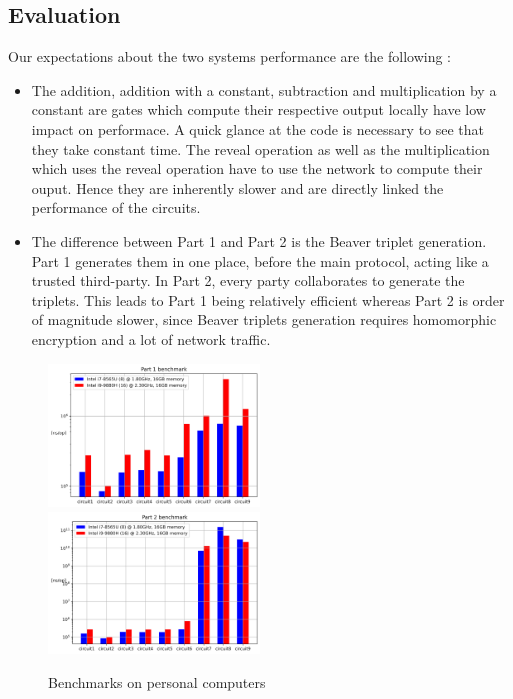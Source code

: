 \documentclass[10pt,conference]{IEEEtran}
\begin{document}
\begin{itemize}
\section{Evaluation}
Our expectations about the two systems performance are the following :
\begin{itemize}
    \item The addition, addition with a constant, subtraction and multiplication by a constant are gates which compute their respective output locally have low impact on performace. A quick glance at the code is necessary to see that they take constant time. The reveal operation as well as the multiplication which uses the reveal operation have to use the network to compute their ouput. Hence they are inherently slower and are directly linked the performance of the circuits.
    \item The difference between Part 1 and Part 2 is the Beaver triplet generation. Part 1 generates them in one place, before the main protocol, acting like a trusted third-party. In Part 2, every party collaborates to generate the triplets. This leads to Part 1 being relatively efficient whereas Part 2 is order of magnitude slower, since Beaver triplets generation requires homomorphic encryption and a lot of network traffic.
\end{itemize}
\begin{figure}[h]
  \caption{Benchmarks on personal computers}
  \label{fig:bench}
  \includegraphics[width=0.5\textwidth]{Part_1_benchmark.png}
  \includegraphics[width=0.5\textwidth]{Part_2_benchmark.png}
\end{figure}

\end{itemize}
\end{document}
